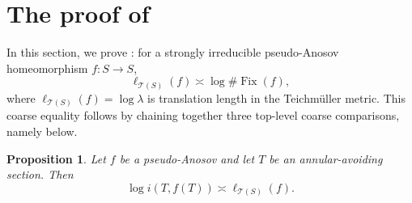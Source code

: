\documentclass[11pt,letterpaper]{amsart}
\newcommand{\teich}{\mathcal T}
\newcommand{\Fix}{\operatorname{Fix}}
\numberwithin{equation}{section}
\newtheorem{proposition}[theorem]{Proposition}
\theoremstyle{definition}
\newcommand{\T}{\mathcal{T}}
\begin{document}
\section{The proof of }\label{Sec:StronglyIrreducibleProof}
In this section, we prove : for a strongly irreducible pseudo-Anosov homeomorphism  $f\colon S \to S$,
\[
\ell_{\teich(S)}(f)  \asymp \log \#\Fix(f),
\]
where $\ell_{\T(S)}(f) = \log \lambda$ is translation length in the Teichm\"uller metric.
This coarse equality follows
by chaining together three top-level coarse comparisons, namely  below.

\begin{proposition}\label{Prop:TeichDistTriangIntersection}
Let $f$ be a pseudo-Anosov and 
let $T$ be an annular-avoiding section. Then 
\[
\log i(T, f(T)) \asymp \ell_{\T(S)}(f).
\]
\end{proposition}
\end{document}
